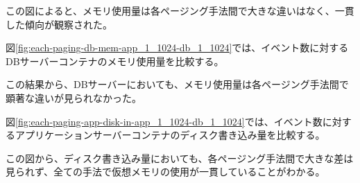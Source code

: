 \documentclass[../../../../main]{subfiles}
\begin{document}
    

    この図によると、メモリ使用量は各ページング手法間で大きな違いはなく、一貫した傾向が観察された。

    図\ref{fig:each-paging-db-mem-app_1_1024-db_1_1024}では、イベント数に対するDBサーバーコンテナのメモリ使用量を比較する。

    

    この結果から、DBサーバーにおいても、メモリ使用量は各ページング手法間で顕著な違いが見られなかった。

    \label{subsubsubsec:result-each-paging-only-limit-disk-in}

    図\ref{fig:each-paging-app-disk-in-app_1_1024-db_1_1024}では、イベント数に対するアプリケーションサーバーコンテナのディスク書き込み量を比較する。

    

    この図から、ディスク書き込み量においても、各ページング手法間で大きな差は見られず、全ての手法で仮想メモリの使用が一貫していることがわかる。
\end{document}
